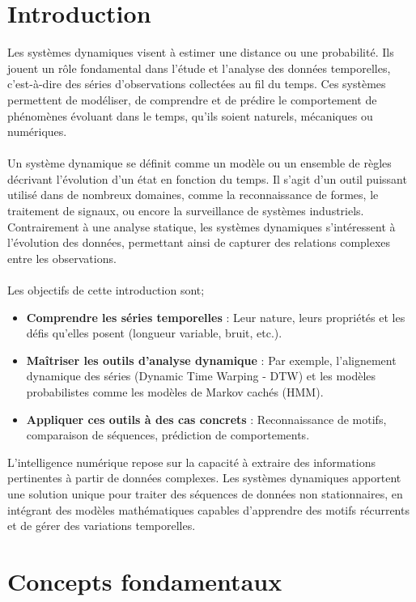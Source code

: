 \documentclass[a4paper,12pt,oneside]{report}	%
\begin{document}
    \section{Introduction}
        \colorbox{bright-blue}{Les systèmes dynamiques visent à estimer une distance ou une probabilité.}
        Ils jouent un rôle fondamental dans l’étude et l’analyse des données temporelles, c’est-à-dire des séries d’observations collectées au fil du temps. Ces systèmes permettent de modéliser, de comprendre et de prédire le comportement de phénomènes évoluant dans le temps, qu’ils soient naturels, mécaniques ou numériques.\\\\
        Un système dynamique se définit comme un modèle ou un ensemble de règles décrivant l'évolution d’un état en fonction du temps. Il s'agit d'un outil puissant utilisé dans de nombreux domaines, comme la reconnaissance de formes, le traitement de signaux, ou encore la surveillance de systèmes industriels. Contrairement à une analyse statique, les systèmes dynamiques s’intéressent à l'évolution des données, permettant ainsi de capturer des relations complexes entre les observations.\\\\
        Les objectifs de cette introduction sont;
        \begin{itemize}
            \item \textbf{Comprendre les séries temporelles} : Leur nature, leurs propriétés et les défis qu’elles posent (longueur variable, bruit, etc.).
            \item \textbf{Maîtriser les outils d’analyse dynamique} : Par exemple, l’alignement dynamique des séries (Dynamic Time Warping - DTW) et les modèles probabilistes comme les modèles de Markov cachés (HMM).
            \item \textbf{Appliquer ces outils à des cas concrets} : Reconnaissance de motifs, comparaison de séquences, prédiction de comportements.
        \end{itemize}
        L’intelligence numérique repose sur la capacité à extraire des informations pertinentes à partir de données complexes. Les systèmes dynamiques apportent une solution unique pour traiter des séquences de données non stationnaires, en intégrant des modèles mathématiques capables d’apprendre des motifs récurrents et de gérer des variations temporelles.
    \section{Concepts fondamentaux}
\end{document}
